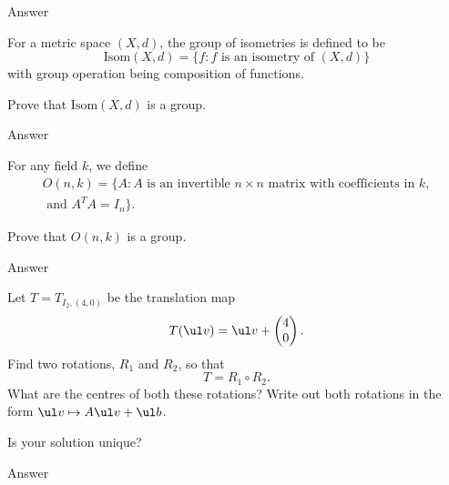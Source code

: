 \documentclass[a4paper]{article}
\begin{document}
Answer



\begin{questionbody}
For a metric space $(X, d)$, the group of isometries is defined to be \[
\mathrm{Isom}(X, d) = \{ f : f \text{ is an isometry of } (X, d) \}
\] with group operation being composition of functions.

Prove that $\mathrm{Isom}(X, d)$ is a group.
\end{questionbody}

Answer



\begin{questionbody}
For any field $k$, we define \begin{equation*}
\begin{split}
O(n, k) = \{ A : A \text{ is an invertible } n \times n \text{ matrix with coefficients in } k, \\
\text{ and } A^T A = I_n \}.
\end{split}
\end{equation*} %

Prove that $O(n, k)$ is a group.
\end{questionbody}

Answer



\begin{questionbody}
%
Let $T = T_{I_2, (4, 0)}$ be the translation map \[
T(\ul v) = \ul v + \begin{pmatrix} 4 \\ 0 \end{pmatrix}.
\] Find two rotations, $R_1$ and $R_2$, so that \[
T = R_1 \circ R_2.
\] What are the centres of both these rotations? Write out both rotations in the form $\ul v \mapsto A \ul v + \ul b$.

Is your solution unique?
\end{questionbody}

Answer

\end{document}
